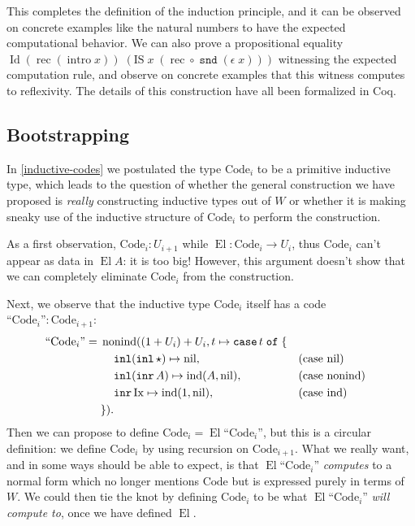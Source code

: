 \documentclass[a4paper,UKenglish,cleveref,nameinlink,autoref,thm-restate]{lipics-v2019}
\DeclareMathOperator{\case}{\mathtt{case}}
\DeclareMathOperator{\Idop}{\mathrm{Id}}
\newcommand{\Id}[2]{\Idop {#1}\;{#2}}
\DeclareMathOperator{\inl}{\mathtt{inl}}
\DeclareMathOperator{\inr}{\mathtt{inr}}
\DeclareMathOperator{\snd}{\mathtt{snd}}
\newcommand{\IS}{\mathrm{IS}}
\DeclareMathOperator{\nonind}{nonind}
\DeclareMathOperator{\ind}{ind}
\DeclareMathOperator{\nil}{nil}
\newcommand{\Code}{\mathrm{Code}}
\newcommand{\Ix}{\mathrm{Ix}}
\DeclareMathOperator{\El}{El}
\DeclareMathOperator{\intro}{intro}
\DeclareMathOperator{\rec}{rec}
\newcommand{\mathquote}[1]{\text{``${#1}$''}}
\begin{document}
This completes the definition of the induction principle, and it can be observed on concrete examples like the natural numbers to have the expected computational behavior. We can also prove a propositional equality $\Id{(\rec(\intro x))}{(\IS\;x\;(\rec\circ \snd(\epsilon\;x)))}$ witnessing the expected computation rule, and observe on concrete examples that this witness computes to reflexivity. The details of this construction have all been formalized in Coq.

\subsection{Bootstrapping}\label{bootstrap}
In \cref{inductive-codes} we postulated the type $\Code_i$ to be a primitive inductive type, which leads to the question of whether the general construction we have proposed is \emph{really} constructing inductive types out of $W$ or whether it is making sneaky use of the inductive structure of $\Code_i$ to perform the construction.

As a first observation, $\Code_i : U_{i+1}$ while $\El : \Code_i \to U_i$, thus $\Code_i$ can't appear as data in $\El A$: it is too big! However, this argument doesn't show that we can completely eliminate $\Code_i$ from the construction.

Next, we observe that the inductive type $\Code_i$ itself has a code $\mathquote{\Code_i} : \Code_{i+1}$:
\begin{align*}
\mathquote{\Code_i} ={}& \nonind((1+U_i)+U_i,t \mapsto \case t\;\mathtt{of}\;\{\\
&\quad \inl(\inl\star) \mapsto \nil,&&\text{(case $\nil$)} \notag\\
&\quad \inl(\inr A) \mapsto \ind(A,\nil),&&\text{(case $\nonind$)} \notag\\
&\quad \inr \Ix \mapsto \ind(1,\nil),&&\text{(case $\ind$)} \notag\\
&\notag\}).
\end{align*}
Then we can propose to define $\Code_i = \El \mathquote{\Code_i}$, but this is a circular definition: we define $\Code_i$ by using recursion on $\Code_{i+1}$. What we really want, and in some ways should be able to expect, is that $\El\mathquote{\Code_i}$ \emph{computes} to a normal form which no longer mentions $\Code$ but is expressed purely in terms of $W$. We could then tie the knot by defining $\Code_i$ to be what $\El \mathquote{\Code_i}$ \emph{will compute to}, once we have defined $\El$.
\end{document}
